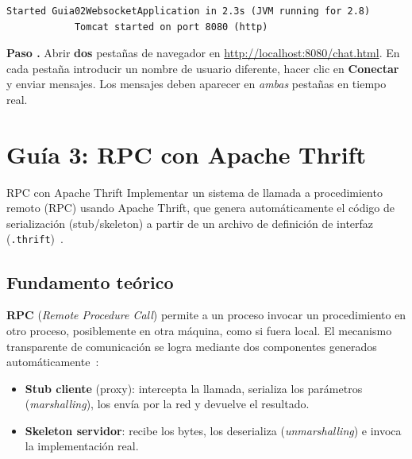 \documentclass[12pt, a4paper, openany]{book}
\newcounter{paso}[section]
\newcommand{\resetpasos}{\setcounter{paso}{0}}
\newcommand{\paso}[1]{%
	\stepcounter{paso}%
	\medskip\noindent
	\begin{tcolorbox}[enhanced, colback=white, colframe=practiceBlue,
		boxrule=0.8pt, arc=3pt, left=6pt, right=6pt, top=4pt, bottom=4pt,
		before upper={\noindent}]
		\textcolor{practiceBlue}{\textbf{Paso \arabic{paso}.}} #1
	\end{tcolorbox}%
}
\newcommand{\code}[1]{\texttt{\small#1}}
\begin{document}
	\begin{resultadobox}
		\begin{lstlisting}[style=BashStyle]
			Started Guia02WebsocketApplication in 2.3s (JVM running for 2.8)
			Tomcat started on port 8080 (http)
		\end{lstlisting}
	\end{resultadobox}
	
	\paso{Abrir \textbf{dos} pestañas de navegador en
		\url{http://localhost:8080/chat.html}. En cada pestaña introducir
		un nombre de usuario diferente, hacer clic en \textbf{Conectar} y enviar
		mensajes. Los mensajes deben aparecer en \emph{ambas} pestañas en tiempo real.}
	
	\chapter{Guía 3: RPC con Apache Thrift}
	\resetpasos
	
	\begin{objetivobox}{RPC con Apache Thrift}
		Implementar un sistema de llamada a procedimiento remoto (RPC) usando Apache
		Thrift, que genera automáticamente el código de serialización (stub/skeleton)
		a partir de un archivo de definición de interfaz (\code{.thrift})~\parencite{slee2007}.
	\end{objetivobox}
	
	\section{Fundamento teórico}
	
	\textbf{RPC} (\textit{Remote Procedure Call}) permite a un proceso invocar un
	procedimiento en otro proceso, posiblemente en otra máquina, como si fuera local.
	El mecanismo transparente de comunicación se logra mediante dos componentes
	generados automáticamente~\parencite{birrell1984}:
	
	\begin{itemize}
		\item \textbf{Stub cliente} (proxy): intercepta la llamada, serializa los
		parámetros (\emph{marshalling}), los envía por la red y devuelve el resultado.
		\item \textbf{Skeleton servidor}: recibe los bytes, los deserializa
		(\emph{unmarshalling}) e invoca la implementación real.
	\end{itemize}
	
\end{document}
